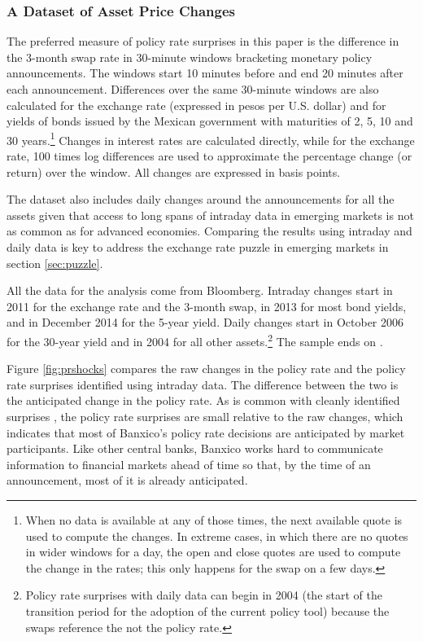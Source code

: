\sectitlespace
\subsubsection{A Dataset of Asset Price Changes} \label{sec:dataset}
\sectitlespace
The preferred measure of policy rate surprises in this paper is the difference in the 3-month swap rate in 30-minute windows bracketing monetary policy announcements. The windows start 10 minutes before and end 20 minutes after each announcement. Differences over the same 30-minute windows are also calculated for the exchange rate (expressed in pesos per U.S. dollar) and for yields of bonds issued by the Mexican government with maturities of 2, 5, 10 and 30 years.\footnote{When no data is available at any of those times, the next available quote is used to compute the changes. In extreme cases, in which there are no quotes in wider windows for a day, the open and close quotes are used to compute the change in the rates; this only happens for the swap on a few days.} Changes in interest rates are calculated directly, while for the exchange rate, 100 times log differences are used to approximate the percentage change (or return) over the window. All changes are expressed in basis points. 

The dataset also includes daily changes around the announcements for all the assets given that access to long spans of intraday data in emerging markets is not as common as for advanced economies. Comparing the results using intraday and daily data is key to address the exchange rate puzzle in emerging markets \parencite{Kohlscheen:2014} in section \ref{sec:puzzle}.

All the data for the analysis come from Bloomberg. Intraday changes start in 2011 for the exchange rate and the 3-month swap, in 2013 for most bond yields, and in December 2014 for the 5-year yield. Daily changes start in October 2006 for the 30-year yield and in 2004 for all other assets.\footnote{Policy rate surprises with daily data can begin in 2004 (the start of the transition period for the adoption of the current policy tool) because the swaps reference the \tiie{} not the policy rate.} The sample ends on \lastobsfx. 

Figure \ref{fig:prshocks} compares the raw changes in the policy rate and the policy rate surprises identified using intraday data. The difference between the two is the anticipated change in the policy rate. As is common with cleanly identified surprises \parencite{NakamuraSteinsson:2018JEP}, the policy rate surprises are small relative to the raw changes, which indicates that most of Banxico's policy rate decisions are anticipated by market participants. Like other central banks, Banxico works hard to communicate information to financial markets ahead of time so that, by the time of an announcement, most of it is already anticipated. 

